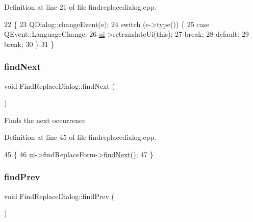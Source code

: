 Definition at line 21 of file findreplacedialog.\+cpp.


\begin{DoxyCode}
22 \{
23     QDialog::changeEvent(e);
24     \textcolor{keywordflow}{switch} (e->type()) \{
25     \textcolor{keywordflow}{case} QEvent::LanguageChange:
26         \hyperlink{class_ui_1_1_find_replace_dialog_a29b7e2e415bc683d3dd089b366cccf4a}{ui}->retranslateUi(\textcolor{keyword}{this});
27         \textcolor{keywordflow}{break};
28     \textcolor{keywordflow}{default}:
29         \textcolor{keywordflow}{break};
30     \}
31 \}
\end{DoxyCode}
\mbox{\label{class_ui_1_1_find_replace_dialog_ac4d4fa5eb9fdda240d855f05b5b6df68}} 
\subsubsection{\texorpdfstring{find\+Next}{findNext}}
{\footnotesize\ttfamily void Find\+Replace\+Dialog\+::find\+Next (\begin{DoxyParamCaption}{ }\end{DoxyParamCaption})\hspace{0.3cm}{\ttfamily [slot]}}

Finds the next occurrence 

Definition at line 45 of file findreplacedialog.\+cpp.


\begin{DoxyCode}
45                                  \{
46     \hyperlink{class_ui_1_1_find_replace_dialog_a29b7e2e415bc683d3dd089b366cccf4a}{ui}->findReplaceForm->\hyperlink{class_ui_1_1_find_replace_dialog_ac4d4fa5eb9fdda240d855f05b5b6df68}{findNext}();
47 \}
\end{DoxyCode}
\mbox{\label{class_ui_1_1_find_replace_dialog_af48970c4a221387bc4df6b7f521af693}} 
\subsubsection{\texorpdfstring{find\+Prev}{findPrev}}
{\footnotesize\ttfamily void Find\+Replace\+Dialog\+::find\+Prev (\begin{DoxyParamCaption}{ }\end{DoxyParamCaption})\hspace{0.3cm}{\ttfamily [slot]}}

